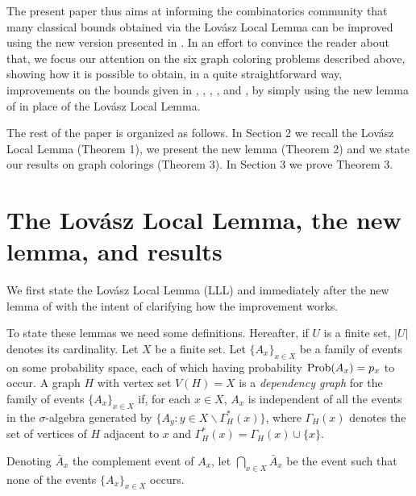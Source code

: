 \documentclass[11pt]{article}
\begin{document}
The present paper thus aims  at informing  the  combinatorics community
that many classical bounds  obtained via the Lov\'asz Local Lemma  can be improved using the new version presented in  \cite{BFPS}. In an effort to  convince the reader about that,  we  focus
our attention on  the six  graph coloring problems described above, showing  how it is possible to obtain,  in a quite straightforward way,
improvements  on the bounds  given  in \cite{AMR}, \cite{ASZ}, \cite{FRR}, \cite{HMR}, \cite{MR} and \cite{MNS}, by simply
using the new lemma of \cite{BFPS} in place of the Lov\'asz Local Lemma.

The rest of the paper is organized as follows. In Section 2 we recall the  Lov\'asz Local Lemma (Theorem 1), we present  the new lemma \cite{BFPS} (Theorem 2) and we state our results on graph colorings
(Theorem 3). In Section 3 we prove Theorem 3.



\section{The Lov\'asz Local Lemma, the new lemma, and results}
We first state the  Lov\'asz Local Lemma (LLL)
and immediately after the new lemma of \cite{BFPS} with the intent of
clarifying how the improvement works.

To state these lemmas we need some definitions.
Hereafter, if  $U$ is a finite set,  $|U|$ denotes its cardinality.
Let $X$ be a finite set.
Let $\{A_x\}_{x\in X}$ be a family of events on some probability space,
each of which having probability $\mathbb {\rm Prob}(A_x)=p_x$ to occur.
A graph $H$ with vertex set $V(H)=X$
is a {\it dependency graph} for the family of events
$\{A_x\}_{x\in X}$  if, for each $x\in X$,
$A_x$ is independent of all the events in the $\sigma$-algebra
generated by $\{ A_y: y \in
{X}\backslash \Gamma^{*}_H(x) \}$, where $\Gamma_H(x)$ denotes the set of
vertices of $H$ adjacent to $x$ and
$\Gamma^{*}_H(x)=\Gamma_H(x)\cup\{x\}$.

 Denoting $\bar A_x$  the complement event of $A_x$,  let $\bigcap_{x\in X}\bar A_x$ be the event such that none of the events
$\{A_x\}_{x\in {X}}$  occurs.
\end{document}
